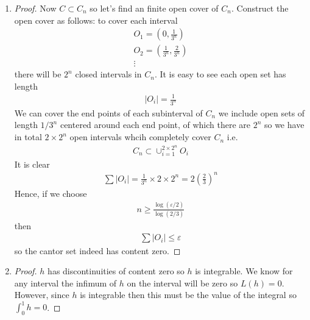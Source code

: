 \begin{enumerate}[label=(\alph*)]
    \item 
    \begin{proof}
        Now $C\subset C_n$ so let's find an finite open cover of 
        $C_n$. Construct the open cover as follows: to cover each interval 
        \begin{gather*}
            O_1 = (0,\frac{1}{3^n}) \\
            O_2 = (\frac{1}{3^n},\frac{2}{3^n}) \\
            \vdots
        \end{gather*}
        there will be $2^n$ closed intervals in $C_n$. It is easy to see 
        each open set has length 
        \begin{align*}
            |O_i| = \frac{1}{3^n}
        \end{align*}
        We can cover the end points of each subinterval of $C_n$ we include 
        open sets of length $1/3^n$ centered around each end point, of which 
        there are $2^n$ so we have in total $2\times 2^n$ open intervals whcih 
        completely cover $C_n$ i.e. 
        \begin{align*}
            C_n \subset \cup_{i=1}^{2 \times 2^n} O_i
        \end{align*}
        It is clear 
        \begin{align*}
            \sum |O_i| = \frac{1}{3^n} \times 2\times 2^n = 2(\frac{2}{3})^n
        \end{align*}
        Hence, if we choose 
        \begin{align*}
            n\geq \frac{\log (\varepsilon/2)}{\log(2/3)}
        \end{align*}
        then 
        \begin{align*}
            \sum |O_i| \leq \varepsilon
        \end{align*}
        so the cantor set indeed has content zero.
    \end{proof}

    \item 
    \begin{proof}
        $h$ has discontinuities of content zero so $h$ is integrable. 
        We know for any interval the infimum of $h$ on the interval will 
        be zero so $L(h)=0$. However, since $h$ is integrable then this 
        must be the value of the integral so $\int_0^1 h = 0$.
    \end{proof}
\end{enumerate}


